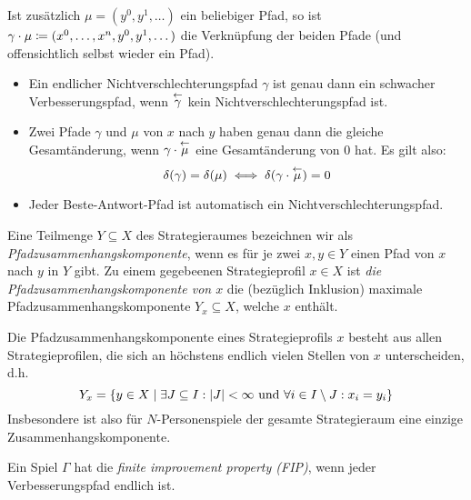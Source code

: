 \begin{defn}
	Ist zusätzlich $\mu = (y^0, y^1, \dots)$ ein beliebiger Pfad, so ist $\gamma\cdot\mu \coloneqq (x^0, \dots, x^n, y^0, y^1, \dots)$ die Verknüpfung der beiden Pfade (und offensichtlich selbst wieder ein Pfad).
\end{defn}

\begin{beob}
	\begin{itemize}
		\item Ein endlicher Nichtverschlechterungspfad $\gamma$ ist genau dann ein schwacher Verbesserungspfad, wenn $\overset{\leftarrow}{\gamma}$ kein Nichtverschlechterungspfad ist. 
		
		\item Zwei Pfade $\gamma$ und $\mu$ von $x$ nach $y$ haben genau dann die gleiche Gesamtänderung, wenn $\gamma\cdot\overset{\leftarrow}{\mu}$ eine Gesamtänderung von $0$ hat. Es gilt also: 
		\[\delta(\gamma) = \delta(\mu) \iff \delta(\gamma\cdot\overset{\leftarrow}{\mu})=0 \]
		
		\item Jeder Beste-Antwort-Pfad ist automatisch ein Nichtverschlechterungspfad.
	\end{itemize}
\end{beob}

\begin{defn}
	Eine Teilmenge $Y \subseteq X$ des Strategieraumes bezeichnen wir als \emph{Pfadzusammenhangskomponente}, wenn es für je zwei $x, y \in Y$ einen Pfad von $x$ nach $y$ in $Y$ gibt. Zu einem gegebeenen Strategieprofil $x \in X$ ist \emph{die Pfadzusammenhangskomponente von $x$} die (bezüglich Inklusion) maximale Pfadzusammenhangskomponente $Y_x \subseteq X$, welche $x$ enthält.
\end{defn}

\begin{beob}
	Die Pfadzusammenhangskomponente eines Strategieprofils $x$ besteht aus allen Strategieprofilen, die sich an höchstens endlich vielen Stellen von $x$ unterscheiden, d.h.
		\[Y_x = \left\{y \in X \mid \exists J \subseteq I: \left|J\right| < \infty \text{ und } \forall i \in I\setminus J: x_i = y_i \right\} \]
	Insbesondere ist also für $N$-Personenspiele der gesamte Strategieraum eine einzige Zusammenhangskomponente.
\end{beob}

\begin{defn}
	Ein Spiel $\Gamma$ hat die \emph{finite improvement property (FIP)}, wenn jeder Verbesserungspfad endlich ist.
\end{defn}

